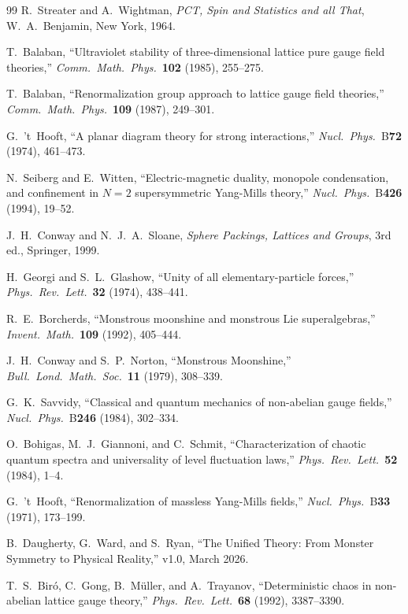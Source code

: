 \documentclass[11pt,a4paper]{article}
\theoremstyle{plain}
\theoremstyle{remark}
\begin{document}
\begin{thebibliography}{99}
R.~Streater and A.~Wightman,
\textit{PCT, Spin and Statistics and all That},
W.~A.~Benjamin, New York, 1964.

T.~Balaban,
``Ultraviolet stability of three-dimensional lattice pure gauge field
theories,''
\textit{Comm.~Math.~Phys.}~\textbf{102} (1985), 255--275.

T.~Balaban,
``Renormalization group approach to lattice gauge field theories,''
\textit{Comm.~Math.~Phys.}~\textbf{109} (1987), 249--301.

G.~'t~Hooft,
``A planar diagram theory for strong interactions,''
\textit{Nucl.~Phys.}~B\textbf{72} (1974), 461--473.

N.~Seiberg and E.~Witten,
``Electric-magnetic duality, monopole condensation, and confinement in
$N = 2$ supersymmetric Yang-Mills theory,''
\textit{Nucl.~Phys.}~B\textbf{426} (1994), 19--52.

J.~H.~Conway and N.~J.~A.~Sloane,
\textit{Sphere Packings, Lattices and Groups}, 3rd ed.,
Springer, 1999.

H.~Georgi and S.~L.~Glashow,
``Unity of all elementary-particle forces,''
\textit{Phys.~Rev.~Lett.}~\textbf{32} (1974), 438--441.

R.~E.~Borcherds,
``Monstrous moonshine and monstrous Lie superalgebras,''
\textit{Invent.~Math.}~\textbf{109} (1992), 405--444.

J.~H.~Conway and S.~P.~Norton,
``Monstrous Moonshine,''
\textit{Bull.~Lond.~Math.~Soc.}~\textbf{11} (1979), 308--339.

G.~K.~Savvidy,
``Classical and quantum mechanics of non-abelian gauge fields,''
\textit{Nucl.~Phys.}~B\textbf{246} (1984), 302--334.

O.~Bohigas, M.~J.~Giannoni, and C.~Schmit,
``Characterization of chaotic quantum spectra and universality of level
fluctuation laws,''
\textit{Phys.~Rev.~Lett.}~\textbf{52} (1984), 1--4.

G.~'t~Hooft,
``Renormalization of massless Yang-Mills fields,''
\textit{Nucl.~Phys.}~B\textbf{33} (1971), 173--199.

B.~Daugherty, G.~Ward, and S.~Ryan,
``The Unified Theory: From Monster Symmetry to Physical Reality,''
v1.0, March 2026.

T.~S.~Bir\'o, C.~Gong, B.~M\"uller, and A.~Trayanov,
``Deterministic chaos in non-abelian lattice gauge theory,''
\textit{Phys.~Rev.~Lett.}~\textbf{68} (1992), 3387--3390.


\end{thebibliography}
\end{document}
